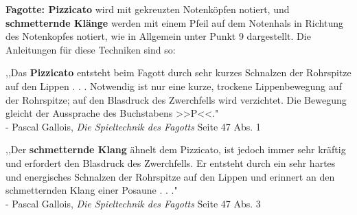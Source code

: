 \documentclass[12pt]{article}
\newcommand*\circled[1]{\tikz[baseline=(char.base)]{
            \node[shape=circle,draw,inner sep=1pt] (char) {#1};}}
\begin{document}
\begingroup
\textbf{Fagotte: \circled{1} Pizzicato} wird mit gekreuzten Notenköpfen notiert, und \textbf{schmetternde Klänge} werden mit einem Pfeil auf dem Notenhals in Richtung des Notenkopfes notiert, wie in Allgemein unter Punkt 9 dargestellt. Die Anleitungen für diese Techniken sind so:
\begin{center}
,,Das \textbf{Pizzicato} entsteht beim Fagott durch sehr kurzes Schnalzen der Rohrspitze auf den Lippen . . . Notwendig ist nur eine kurze, trockene Lippenbewegung auf der Rohrspitze; auf den Blasdruck des Zwerchfells wird verzichtet. Die Bewegung gleicht der Aussprache des Buchstabens >>P<<." \\

- Pascal Gallois, \textit{Die Spieltechnik des Fagotts} Seite 47 Abs. 1
\end{center}
\endgroup

\begingroup
\begin{center}
,,Der \textbf{schmetternde Klang} ähnelt dem Pizzicato, ist jedoch immer sehr kräftig und erfordert den Blasdruck des Zwerchfells. Er entsteht durch ein sehr hartes und energisches Schnalzen der Rohrspitze auf den Lippen und erinnert an den schmetternden Klang einer Posaune . . ." \\

- Pascal Gallois, \textit{Die Spieltechnik des Fagotts} Seite 47 Abs. 3
\end{center}
\endgroup
\end{document}
